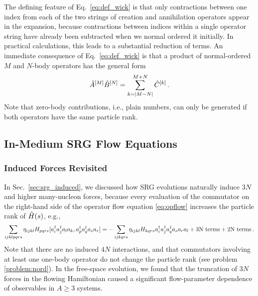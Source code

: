 {The defining feature of Eq.~\eqref{eq:def_wick} is that only contractions 
between one index from each of the two strings of creation and annihilation
operators appear in the expansion, because contractions between indices 
within a single operator string have already been subtracted when we normal 
ordered it initially. In practical calculations, this leads to a substantial 
reduction of terms. An immediate consequence of Eq.~\eqref{eq:def_wick} is 
that a product of normal-ordered $M$ and $N$-body operators has the general 
form
\begin{equation}\label{eq:wick_product_schematic}
  \AO^{[M]}\BO^{[N]} = \sum_{k=|M-N|}^{M+N}\CO^{[k]}\,.
\end{equation}
Note that zero-body contributions, i.e., plain numbers, can only be generated 
if both operators have the same particle rank.

\subsection{\label{sec:imsrg_flow}In-Medium SRG Flow Equations}

%
%
\subsubsection{Induced Forces Revisited}
In Sec.~\ref{sec:srg_induced}, we discussed how SRG evolutions naturally
induce $3N$ and higher many-nucleon forces, because every evaluation of 
the commutator on the right-hand side of the operator flow equation 
\eqref{eq:opflow} increases the particle rank of $\hat{H}(s)$, e.g.,
\begin{equation}\label{eq:induced_3N}
  \sum_{ijklpqrs}\eta_{ijkl}H_{pqrs}\comm{\aaO_{i}\aaO_{j}\aO_{l}\aO_{k}}{\aaO_{p}\aaO_{q}\aO_{s}\aO_{r}}
    = -\sum_{ijkqrs}\eta_{ijkl}H_{kqrs} \aaO_{i}\aaO_{j}\aaO_{q}\aO_{s}\aO_{r}\aO_{l} + \text{3N terms} + \text{2N terms}\,.
\end{equation}
Note that there are no induced $4N$ interactions, and that commutators
involving at least one one-body operator do not change the particle rank
(see problem \ref{problem:nord}). In the free-space evolution, we 
found that the truncation of $3N$ forces in the flowing Hamiltonian caused
a significant flow-parameter dependence of observables in $A\geq 3$ systems.

}

